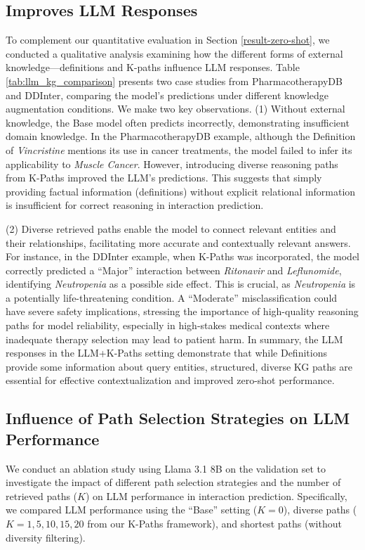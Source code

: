 \subsection{\sys Improves LLM Responses}
To complement our quantitative evaluation in Section \ref{result-zero-shot}, we conducted a qualitative analysis examining how the different forms of external knowledge—definitions and K-paths influence LLM responses. 
Table \ref{tab:llm_kg_comparison} presents two case studies from PharmacotherapyDB and DDInter, comparing the model's predictions under different knowledge augmentation conditions.
We make two key observations.
(1) Without external knowledge, the Base model often predicts incorrectly, demonstrating insufficient domain knowledge.
In the PharmacotherapyDB example, although the Definition of \textit{Vincristine} mentions its use in cancer treatments, the model failed to infer its applicability to \textit{Muscle Cancer}.
However, introducing diverse reasoning paths from K-Paths improved the LLM's predictions.
This suggests that simply providing factual information (definitions) without explicit relational information is insufficient for correct reasoning in interaction prediction. 

(2) Diverse retrieved paths enable the model to connect relevant entities and their relationships, facilitating more accurate and contextually relevant answers. 
For instance, in the DDInter example, when K-Paths was incorporated, the model correctly predicted a ``Major'' interaction between \textit{Ritonavir} and \textit{Leflunomide}, identifying \textit{Neutropenia} as a possible side effect. This is crucial, as \textit{Neutropenia} is a potentially life-threatening condition.
A ``Moderate'' misclassification could have severe safety implications, stressing the importance of high-quality reasoning paths for model reliability, especially in high-stakes medical contexts where inadequate therapy selection may lead to patient harm.
In summary, the LLM responses in the LLM+K-Paths setting demonstrate that while Definitions provide some information about query entities, structured, diverse KG paths are essential for effective contextualization and improved zero-shot performance. 


\subsection{Influence of Path Selection Strategies on LLM Performance}
We conduct an ablation study using Llama 3.1 8B on the validation set to investigate the impact of different path selection strategies and the number of retrieved paths ($K$) on LLM performance in interaction prediction.  
Specifically, we compared LLM performance using the ``Base'' setting ($K=0$), diverse paths ($K=1, 5, 10, 15, 20$ from our K-Paths framework), and shortest paths (without diversity filtering).

